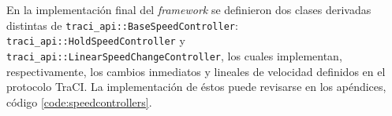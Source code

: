 

En la implementación final del \emph{framework} se definieron dos clases derivadas distintas de \texttt{traci\_api::BaseSpeedController}: \texttt{traci\_api::HoldSpeedController} y \texttt{traci\_api::LinearSpeedChangeController}, los cuales implementan, respectivamente, los cambios inmediatos y lineales de velocidad definidos en el protocolo TraCI. La implementación de éstos puede revisarse en los apéndices, código \ref{code:speedcontrollers}.



